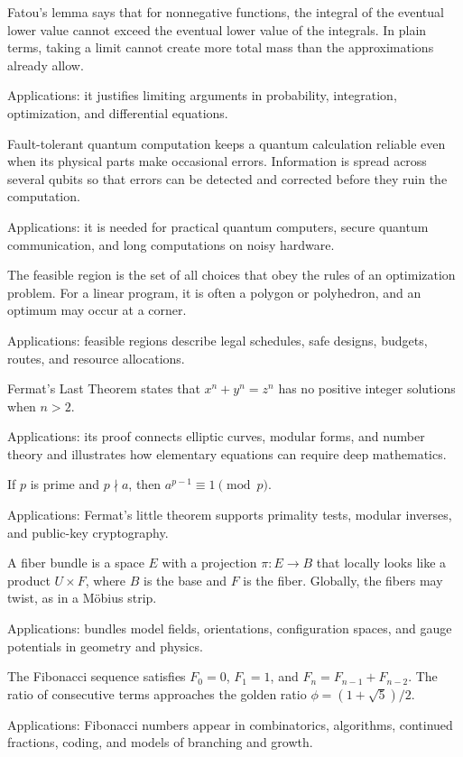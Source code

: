 Fatou's lemma says that for nonnegative functions, the integral of the eventual lower value cannot exceed the eventual lower value of the integrals. In plain terms, taking a limit cannot create more total mass than the approximations already allow. \par\noindent Applications: it justifies limiting arguments in probability, integration, optimization, and differential equations.

Fault-tolerant quantum computation keeps a quantum calculation reliable even when its physical parts make occasional errors. Information is spread across several qubits so that errors can be detected and corrected before they ruin the computation. \par\noindent Applications: it is needed for practical quantum computers, secure quantum communication, and long computations on noisy hardware.

The feasible region is the set of all choices that obey the rules of an optimization problem. For a linear program, it is often a polygon or polyhedron, and an optimum may occur at a corner. \par\noindent Applications: feasible regions describe legal schedules, safe designs, budgets, routes, and resource allocations.

Fermat's Last Theorem states that $x^n+y^n=z^n$ has no positive integer solutions when $n>2$. \par\noindent Applications: its proof connects elliptic curves, modular forms, and number theory and illustrates how elementary equations can require deep mathematics.

If $p$ is prime and $p\nmid a$, then $a^{p-1}\equiv1\pmod p$. \par\noindent Applications: Fermat's little theorem supports primality tests, modular inverses, and public-key cryptography.

A fiber bundle is a space $E$ with a projection $\pi:E\to B$ that locally looks like a product $U\times F$, where $B$ is the base and $F$ is the fiber. Globally, the fibers may twist, as in a Möbius strip. \par\noindent Applications: bundles model fields, orientations, configuration spaces, and gauge potentials in geometry and physics.

The Fibonacci sequence satisfies $F_0=0$, $F_1=1$, and $F_n=F_{n-1}+F_{n-2}$. The ratio of consecutive terms approaches the golden ratio $\phi=(1+\sqrt5)/2$. \par\noindent Applications: Fibonacci numbers appear in combinatorics, algorithms, continued fractions, coding, and models of branching and growth.

